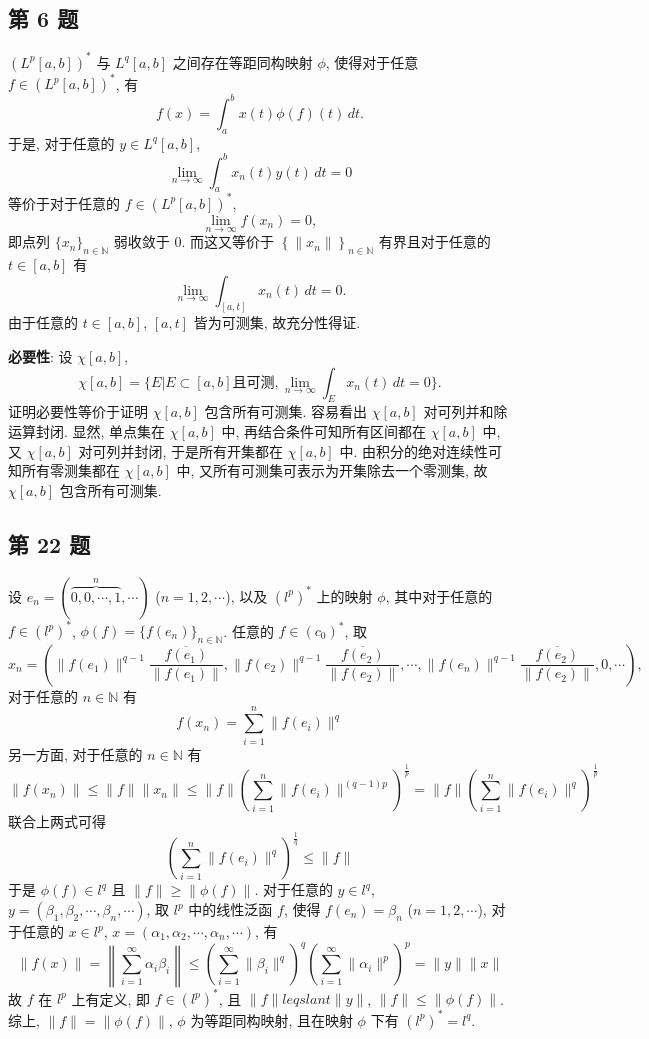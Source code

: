 \documentclass[../main.tex]{subfiles}
\begin{document}
\subsection{第 6 题}
$(L^p [a, b])^{*}$ 与 $L^q [a, b]$ 之间存在等距同构映射 $\phi$,
使得对于任意 $f \in (L^p [a, b])^{*}$, 有
\[
    f(x) = \int_{a}^{b} x(t) \phi (f) (t) \, dt.
\]
于是, 对于任意的 $y \in L^q [a, b]$,
\[
    \lim_{n \to \infty} \int_{a}^{b} x_n(t) y(t) \, dt = 0
\]
等价于对于任意的 $f \in (L^p [a, b])^{*}$,
\[
    \lim_{n \to \infty} f(x_n) = 0,
\]
即点列 $\{ x_{n} \}_{n \in \mathbb{N}}$ 弱收敛于 $0$.
而这又等价于 $\left\{ \| x_n \| \right\}_{n \in \mathbb{N}}$ 有界且对于任意的 $t \in [a, b]$ 有
\[
    \lim_{n \to \infty} \int_{[a, t]} x_n(t) \, dt = 0.
\]
由于任意的 $t \in [a, b]$, $[a, t]$ 皆为可测集, 故充分性得证.

\noindent \textbf{必要性}:
设 $\chi [a, b]$,
\[
    \chi [a, b] = \{ E | E \subset [a, b] \text{且可测}, \lim_{n \to \infty} \int_{E} x_n(t) \, dt = 0 \}.
\]
证明必要性等价于证明 $\chi [a, b]$ 包含所有可测集.
容易看出 $\chi [a, b]$ 对可列并和除运算封闭.
显然, 单点集在 $\chi [a, b]$ 中, 再结合条件可知所有区间都在 $\chi [a, b]$ 中,
又 $\chi [a, b]$ 对可列并封闭, 于是所有开集都在 $\chi [a, b]$ 中.
由积分的绝对连续性可知所有零测集都在 $\chi [a, b]$ 中,
又所有可测集可表示为开集除去一个零测集, 故 $\chi [a, b]$ 包含所有可测集.

\subsection{第 22 题}
设 $e_n = (\overbrace{0, 0, \cdots, 1}^{n}, \cdots)$ ($n = 1, 2, \cdots$),
以及 $(l^p)^*$ 上的映射 $\phi$,
其中对于任意的 $f \in (l^p)^*$, $\phi (f) = \{ f(e_n) \}_{n \in \mathbb{N}}$.
任意的 $f \in (c_0)^*$, 取
\[
    x_n = (\| f(e_1) \|^{q - 1} \frac{\overline{f(e_1)}}{\| f(e_1) \|},
    \| f(e_2) \|^{q - 1} \frac{\overline{f(e_2)}}{\| f(e_2) \|},
    \cdots,
    \| f(e_n) \|^{q - 1} \frac{\overline{f(e_2)}}{\| f(e_2) \|}, 0, \cdots),
\]
对于任意的 $n \in \mathbb{N}$ 有
\[
    f(x_n) = \sum_{i = 1}^{n} \| f(e_i) \|^q
\]
另一方面, 对于任意的 $n \in \mathbb{N}$ 有
\[
    \| f(x_n) \|
    \leqslant \| f \| \| x_n \|
    \leqslant \| f \| \left( \sum_{i = 1}^{n} \| f(e_i) \|^{(q - 1) p} \right)^{\frac{1}{p}}
    = \| f \| \left( \sum_{i = 1}^{n} \| f(e_i) \|^{q} \right)^{\frac{1}{p}}
\]
联合上两式可得
\[
    \left( \sum_{i = 1}^{n} \| f(e_i) \|^q \right)^{\frac{1}{q}} \leqslant \| f \|
\]
于是 $\phi (f) \in l^q$ 且 $\| f \| \geqslant \| \phi (f) \|$.
对于任意的 $y \in l^q$, $y = (\beta_1, \beta_2, \cdots, \beta_n, \cdots)$,
取 $l^p$ 中的线性泛函 $f$, 使得 $f(e_n) = \beta_n$ ($n = 1, 2, \cdots$),
对于任意的 $x \in l^p$, $x = (\alpha_1, \alpha_2, \cdots, \alpha_n, \cdots)$, 有
\[
    \| f(x) \|
    = \left\| \sum_{i = 1}^{\infty} \alpha_i \beta_i \right\| 
    \leqslant \left( \sum_{i = 1}^{\infty} \| \beta_i \|^q \right)^q \left( \sum_{i = 1}^{\infty} \| \alpha_i \|^p \right)^p
    = \| y \| \| x \|
\]
故 $f$ 在 $l^p$ 上有定义, 即 $f \in (l^p)^*$,
且 $\| f \| leqslant \| y \|$, $\| f \| \leqslant \| \phi (f) \|$.
综上, $\| f \| = \| \phi (f) \|$, $\phi$ 为等距同构映射, 且在映射 $\phi$ 下有 $(l^p)^* = l^q$.
\end{document}
